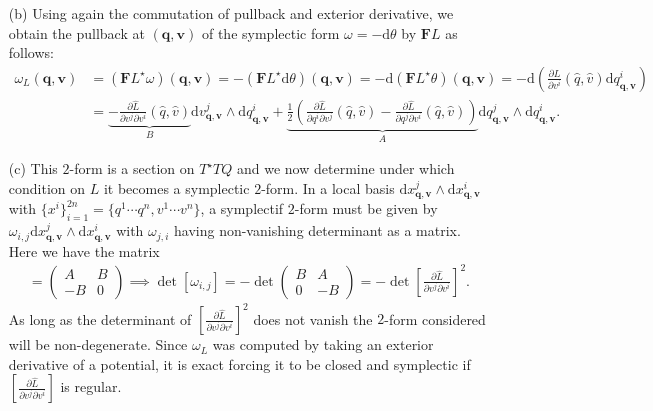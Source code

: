 \documentclass[10pt, a4paper]{article}
\begin{document}
{\begin{enumerate}
  \item[(b)] Using again the commutation of pullback and exterior derivative, we obtain the pullback at $(\mathbf{q}, \mathbf{v})$ of the symplectic form $\omega = -\text{d}\theta$ by $\mathbf{F}L$ as follows:
  \begin{align*}
    \omega_L(\mathbf{q}, \mathbf{v}) &= (\mathbf{F}L^{\star}\omega) (\mathbf{q}, \mathbf{v}) = -(\mathbf{F}L^{\star}\text{d}\theta) (\mathbf{q}, \mathbf{v}) =  -\text{d} (\mathbf{F}L^{\star}\theta) (\mathbf{q}, \mathbf{v}) = -\text{d} \left(\frac{\partial \hat{L}}{\partial v^i} (\hat{q}, \hat{v}) \text{d}q^{i}_{\mathbf{q}, \mathbf{v}}\right)\\
    &= \underbrace{-\frac{\partial \hat{L}}{\partial v^j \partial v^i} (\hat{q}, \hat{v})}_B  \text{d}v^{j}_{\mathbf{q}, \mathbf{v}} \wedge \text{d}q^{i}_{\mathbf{q}, \mathbf{v}} + \underbrace{\frac{1}{2}\left(\frac{\partial \hat{L}}{\partial q^i \partial v^j} (\hat{q}, \hat{v}) - \frac{\partial \hat{L}}{\partial q^j \partial v^i} (\hat{q}, \hat{v})\right)}_{A}\text{d}q^{j}_{\mathbf{q}, \mathbf{v}} \wedge \text{d}q^{i}_{\mathbf{q}, \mathbf{v}}.
  \end{align*}
  \item[(c)] This $2$-form is a section on $T^\star TQ$ and we now determine under which condition on $L$ it becomes a symplectic $2$-form. In a local basis $\text{d}x^{j}_{\mathbf{q}, \mathbf{v}} \wedge \text{d}x^{i}_{\mathbf{q}, \mathbf{v}}$ with $\{x^i\}_{i = 1}^{2n} = \{q^1 \cdots q^n, v^1 \cdots v^n\}$, a symplectif $2$-form must be given by $\omega_{i, j}\text{d}x^{j}_{\mathbf{q}, \mathbf{v}} \wedge \text{d}x^{i}_{\mathbf{q}, \mathbf{v}}$ with $\omega_{j, i}$ having non-vanishing determinant as a matrix. Here we have the matrix 
  \begin{align*}
    [\omega_{i, j}] = 
    \begin{pmatrix}
      A & B \\
      -B & 0
    \end{pmatrix}\implies \det [\omega_{i, j}] = -\det \begin{pmatrix}
      B & A\\
      0 & -B
    \end{pmatrix} = -\det \left[\frac{\partial \hat{L}}{\partial v^j \partial v^i}\right]^2.
  \end{align*}
  As long as the determinant of $\left[\frac{\partial \hat{L}}{\partial v^j \partial v^i}\right]^2$ does not vanish the $2$-form considered will be non-degenerate. Since $\omega_L$ was computed by taking an exterior derivative of a potential, it is exact forcing it to be closed and symplectic if $\left[\frac{\partial \hat{L}}{\partial v^j \partial v^i}\right]$ is regular. 

\end{enumerate}}
\end{document}
